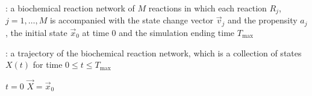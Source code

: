 \begin{algorithm}[H]
\DontPrintSemicolon
{}

\caption{\protect\TitleFunction{}}
\label{algo:frm}

\Input: a biochemical reaction network of $M$ reactions in which each reaction $R_j$, $j=1, \dots, M$ is accompanied with the state change vector $\vec{v}_j$ and the propensity $a_j$, the initial state $\vec{x}_0$ at time $0$ and the simulation ending time $T_{\max}$\;

\Output: a trajectory of the biochemical reaction network, which is a collection of states $X(t)$ for time $0\le t\le T_{\max}$\;

$t = 0$\;
$\vec{X} = \vec{x}_0$\;


\end{algorithm}
